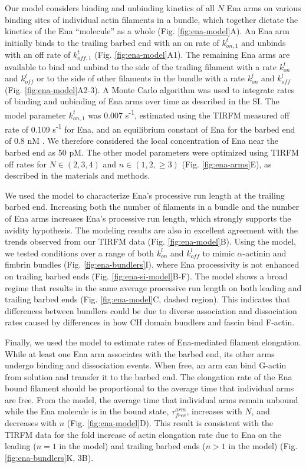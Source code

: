 Our model considers binding and unbinding kinetics of all $N$ Ena arms on various binding sites of individual actin filaments in a bundle, which together dictate the kinetics of the Ena “molecule” as a whole (Fig. \ref{fig:ena-model}A). An Ena arm initially binds to the trailing barbed end with an on rate of $k_{on,1}^{t}$ and unbinds with an off rate of $k_{off,1}^t$ (Fig. \ref{fig:ena-model}A1). The remaining Ena arms are available to bind and unbind to the side of the trailing filament with a rate $k_{on}^{t}$ and $k_{off}^{t}$ or to the side of other filaments in the bundle with a rate $k_{on}^{l}$ and $k_{off}^{l}$ (Fig. \ref{fig:ena-model}A2-3). A Monte Carlo algorithm was used to integrate rates of binding and unbinding of Ena arms over time as described in the SI. The model parameter $k_{on,1}^{t}$ was 0.007 s\textsuperscript{-1}, estimated using the TIRFM measured off rate of 0.109 s\textsuperscript{-1} for Ena, and an equilibrium constant of Ena for the barbed end of 0.8 nM \citep{winkelman_ena/vasp_2014}. We therefore considered the local concentration of Ena near the barbed end as 50 pM. The other model parameters were optimized using TIRFM off rates for $N\in(2,3,4)$ and $n\in(1,2,\geq3)$ (Fig. \ref{fig:ena-arms}E), as described in the materials and methods. 

We used the model to characterize Ena's processive run length at the trailing barbed end. Increasing both the number of filaments in a bundle and the number of Ena arms increases Ena's processive run length, which strongly supports the avidity hypothesis. The modeling results are also in excellent agreement with the trends observed from our TIRFM data (Fig. \ref{fig:ena-model}B). Using the model, we tested conditions over a range of both $k_{on}^{l}$ and $k_{off}^{l}$ to mimic $\alpha$-actinin and fimbrin bundles (Fig. \ref{fig:ena-bundlers}I), where Ena processivity is not enhanced on trailing barbed ends (Fig. \ref{fig:ena-si-model}B-F). The model shows a broad regime that results in the same average processive run length on both leading and trailing barbed ends (Fig. \ref{fig:ena-model}C, dashed region). This indicates that differences between bundlers could be due to diverse association and dissociation rates caused by differences in how CH domain bundlers and fascin bind F-actin. 

Finally, we used the model to estimate rates of Ena-mediated filament elongation. While at least one Ena arm associates with the barbed end, its other arms undergo binding and dissociation events. When free, an arm can bind G-actin from solution and transfer it to the barbed end. The elongation rate of the Ena bound filament should be proportional to the average time that individual arms are free. From the model, the average time that individual arms remain unbound while the Ena molecule is in the bound state, $\tau_{free}^{arm}$, increases with $N$, and decreases with $n$ (Fig. \ref{fig:ena-model}D). This result is consistent with the TIRFM data for the fold increase of actin elongation rate due to Ena on the leading ($n=1$ in the model) and trailing barbed ends ($n>1$ in the model) (Fig. \ref{fig:ena-bundlers}K, 3B).

